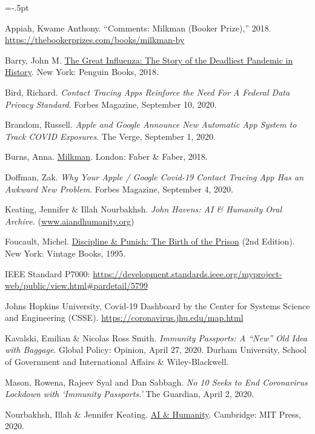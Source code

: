 \documentclass[11pt,dvipdfm]{article}
\begin{document}
 
\vspace{-.1cm}

\begin{thebibliography}{10}
\begin{small}
\itemsep=-.5pt

Appiah, Kwame Anthony.  ``Comments: Milkman (Booker Prize),'' 2018. \\ \url{https://thebookerprizes.com/books/milkman-by} 

Barry, John M.  \underline{The Great Influenza:  The Story of the Deadliest Pandemic in History}.  New York:  Penguin Books, 2018.

Bird, Richard.  \emph{Contact Tracing Apps Reinforce the Need For A Federal Data Privacy Standard}.  Forbes Magazine, September 10, 2020.

Brandom, Russell.  \emph{Apple and Google Announce New Automatic App System to Track COVID Exposures}.  The Verge, September 1, 2020.

Burns, Anna.  \underline{Milkman}.  London:  Faber \& Faber, 2018.

Doffman, Zak.  \emph{Why Your Apple / Google Covid-19 Contact Tracing App Has an Awkward New Problem}.  Forbes Magazine, September 4, 2020.

Keating, Jennifer \& Illah Nourbakhsh. \emph{John Havens:  AI \& Humanity Oral Archive.} (\url{www.aiandhumanity.org}) 

Foucault, Michel.  \underline{Discipline \& Punish:  The Birth of the Prison} (2nd Edition). New York:  Vintage Books, 1995. 

IEEE Standard P7000:   \url{https://development.standards.ieee.org/myproject-web/public/view.html\#pardetail/5799}

Johns Hopkins University, Covid-19 Dashboard by the Center for Systems Science and Engineering (CSSE).  \url{https://coronavirus.jhu.edu/map.html} 

Kavalski, Emilian \& Nicolas Ross Smith.  \emph{Immunity Passports:  A “New” Old Idea with Baggage}.  Global Policy: Opinion, April 27, 2020.  Durham University, School of Government and International Affairs \& Wiley-Blackwell.

Mason, Rowena, Rajeev Syal and Dan Sabbagh.  \emph{No 10 Seeks to End Coronavirus Lockdown with ‘Immunity Passports.’} The Guardian, April 2, 2020.

Nourbakhsh, Illah \& Jennifer Keating.  \underline{AI \& Humanity}.  Cambridge:  MIT Press, 2020.


\end{small}
\end{thebibliography}
\end{document}
